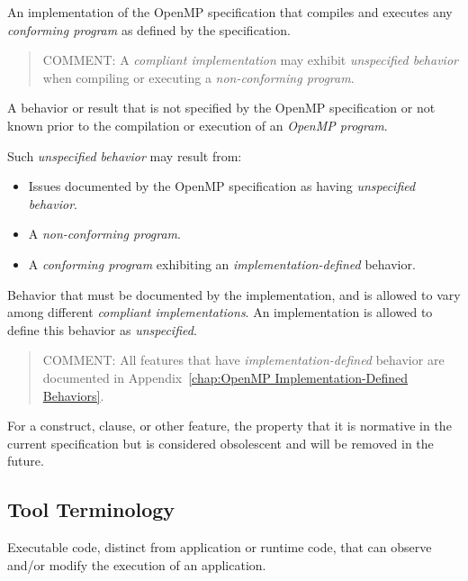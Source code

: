 \glossarydefstart
An implementation of the OpenMP specification that compiles and executes any
\emph{conforming program} as defined by the specification.

\begin{quote}
COMMENT: A \emph{compliant implementation} may exhibit 
\emph{unspecified behavior} when
compiling or executing a \emph{non-conforming program}.
\end{quote}
\glossarydefend

\glossarydefstart
A behavior or result that is not specified by the OpenMP specification or not
known prior to the compilation or execution of an \emph{OpenMP program}.

Such \emph{unspecified behavior} may result from:

\begin{itemize}
\item Issues documented by the OpenMP specification as having 
\emph{unspecified behavior}.

\item A \emph{non-conforming program}.

\item A \emph{conforming program} exhibiting an 
\emph{implementation-defined} behavior.
\end{itemize}
\glossarydefend

\glossarydefstart
Behavior that must be documented by the implementation, and is allowed to vary
among different \emph{compliant implementations}. An implementation is allowed to
define this behavior as \emph{unspecified}.

\begin{quote}
COMMENT: All features that have \emph{implementation-defined} behavior
are documented in Appendix~\ref{chap:OpenMP Implementation-Defined Behaviors}.
\end{quote}
\glossarydefend

\glossarydefstart
For a construct, clause, or other feature, the property that it is normative 
in the current specification but is considered obsolescent and will be 
removed in the future.
\glossarydefend


\subsection{Tool Terminology}

\glossarydefstart
Executable code, distinct from application or runtime code, that can observe 
and/or modify the execution of an application.
\glossarydefend

